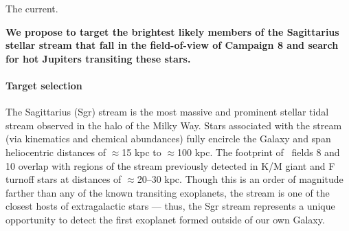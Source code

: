 \documentclass[letterpaper,12pt,preprint]{hack_aastex}
\begin{document}
The current.

{\bf We propose to target the brightest likely members of the Sagittarius
stellar stream that fall in the field-of-view of Campaign 8 and search for hot
Jupiters transiting these stars.}

\paragraph{Target selection}

The Sagittarius (Sgr) stream is the most massive and prominent stellar tidal stream observed in the halo of the Milky Way. Stars associated with the stream (via kinematics and chemical abundances) fully encircle the Galaxy and span heliocentric distances of $\approx$15 kpc to $\approx$100 kpc. The footprint of \KT\ fields 8 and 10 overlap with regions of the stream previously detected in K/M giant and F turnoff stars \citep{Majewski:2003, Yanny:2009} at distances of $\approx$20--30 kpc. Though this is an order of magnitude farther than any of the known transiting exoplanets, the stream is one of the closest hosts of extragalactic stars --- thus, the Sgr stream represents a unique opportunity to detect the first exoplanet formed outside of our own Galaxy.
\end{document}
